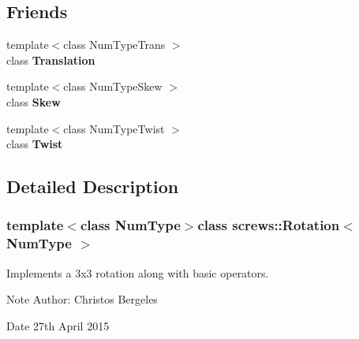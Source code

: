 \subsection*{Friends}
\begin{DoxyCompactItemize}
\item 
\hypertarget{singletonscrews_1_1_rotation_a01e1886aafbf1483da899aba3b6c58da}{{\footnotesize template$<$class Num\+Type\+Trans $>$ }\\class {\bfseries Translation}}\label{singletonscrews_1_1_rotation_a01e1886aafbf1483da899aba3b6c58da}

\item 
\hypertarget{singletonscrews_1_1_rotation_a5df6228d19a297c970567807320a1400}{{\footnotesize template$<$class Num\+Type\+Skew $>$ }\\class {\bfseries Skew}}\label{singletonscrews_1_1_rotation_a5df6228d19a297c970567807320a1400}

\item 
\hypertarget{singletonscrews_1_1_rotation_a90f9fa90695f35a9b08d0e888ea4297e}{{\footnotesize template$<$class Num\+Type\+Twist $>$ }\\class {\bfseries Twist}}\label{singletonscrews_1_1_rotation_a90f9fa90695f35a9b08d0e888ea4297e}

\end{DoxyCompactItemize}


\subsection{Detailed Description}
\subsubsection*{template$<$class Num\+Type$>$class screws\+::\+Rotation$<$ Num\+Type $>$}

Implements a 3x3 rotation along with basic operators. 

\begin{DoxyNote}{Note}
Author\+: Christos Bergeles 
\end{DoxyNote}
\begin{DoxyDate}{Date}
27th April 2015 
\end{DoxyDate}


